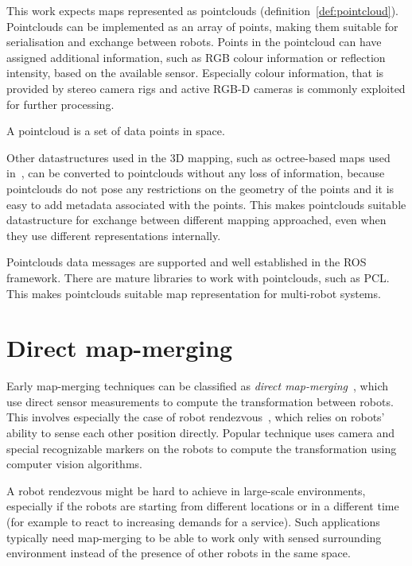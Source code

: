 This work expects maps represented as pointclouds (definition~\ref{def:pointcloud}). Pointclouds can be implemented as an array of points, making them suitable for serialisation and exchange between robots. Points in the pointcloud can have assigned additional information, such as RGB colour information or reflection intensity, based on the available sensor. Especially colour information, that is provided by stereo camera rigs and active \gls{RGB-D} cameras is commonly exploited for further processing.

\begin{defn}[Pointcloud]
\label{def:pointcloud}
A pointcloud is a set of data points in space.
\end{defn}

Other datastructures used in the \gls{3D} mapping, such as octree-based maps used in~\citet{hornung2013octomap}, can be converted to pointclouds without any loss of information, because pointclouds do not pose any restrictions on the geometry of the points and it is easy to add metadata associated with the points. This makes pointclouds suitable datastructure for exchange between different mapping approached, even when they use different representations internally.

Pointclouds data messages are supported and well established in the \gls{ROS} framework. There are mature libraries to work with pointclouds, such as \gls{PCL}. This makes pointclouds suitable map representation for multi-robot systems.

\section{Direct map-merging}

Early map-merging techniques can be classified as \textit{direct map-merging}~\citet{lee2012survey}, which use direct sensor measurements to compute the transformation between robots. This involves especially the case of robot rendezvous~\citet{zhou2006rendezvous}, which relies on robots' ability to sense each other position directly. Popular technique uses camera and special recognizable markers on the robots to compute the transformation using computer vision algorithms.

A robot rendezvous might be hard to achieve in large-scale environments, especially if the robots are starting from different locations or in a different time (for example to react to increasing demands for a service). Such applications typically need map-merging to be able to work only with sensed surrounding environment instead of the presence of other robots in the same space.

